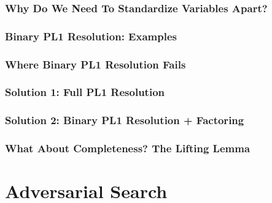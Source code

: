 \documentclass[conference, a4paper]{styles/acmsiggraph}
\begin{document}
        \subsubsection{Why Do We Need To Standardize Variables Apart?}
        \subsubsection{Binary PL1 Resolution: Examples}
        \subsubsection{Where Binary PL1 Resolution Fails}
        \subsubsection{Solution 1: Full PL1 Resolution}
        \subsubsection{Solution 2:  Binary PL1 Resolution + Factoring}
        \subsubsection{What About Completeness?  The Lifting Lemma}

        
    
    
    
    
    
    
    



\section{Adversarial Search}
\end{document}
